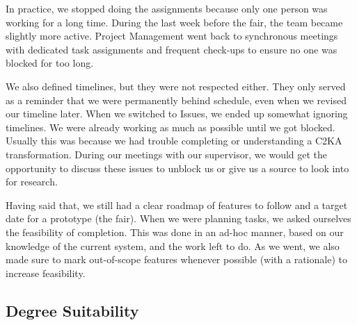 In practice, we stopped doing the assignments because only one person was working for a long time.
During the last week before the fair, the team became slightly more active.
Project Management went back to synchronous meetings with dedicated task assignments and frequent check-ups to ensure no one was blocked for too long.

We also defined timelines, but they were not respected either.
They only served as a reminder that we were permanently behind schedule, even when we revised our timeline later.
When we switched to Issues, we ended up somewhat ignoring timelines.
We were already working as much as possible until we got blocked.
Usually this was because we had trouble completing or understanding a C2KA transformation.
During our meetings with our supervisor, we would get the opportunity to discuss these issues to unblock us or give us a source to look into for research.

Having said that, we still had a clear roadmap of features to follow and a target date for a prototype (the fair).
When we were planning tasks, we asked ourselves the feasibility of completion.
This was done in an ad-hoc manner, based on our knowledge of the current system, and the work left to do.
As we went, we also made sure to mark out-of-scope features whenever possible (with a rationale) to increase feasibility.

\subsection{Degree Suitability}\label{subsec:deg-suit}

